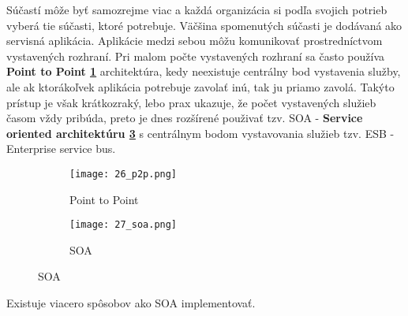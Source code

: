 Súčastí môže byť samozrejme viac a každá organizácia si podľa svojich potrieb vyberá tie  súčasti, ktoré potrebuje. Väčšina spomenutých súčasti je dodávaná ako servisná aplikácia. Aplikácie medzi sebou môžu komunikovať prostredníctvom vystavených rozhraní. Pri malom počte vystavených rozhraní sa často používa \textbf{Point to Point \ref{26_p2p}} architektúra, kedy neexistuje centrálny bod vystavenia služby, ale ak ktorákoľvek aplikácia potrebuje zavolať inú, tak ju priamo zavolá. Takýto prístup je však krátkozraký, lebo prax ukazuje, že počet vystavených služieb časom vždy pribúda, preto je dnes rozšírené použivať tzv. SOA - \textbf{Service oriented architektúru \ref{27_soa}} s centrálnym bodom vystavovania služieb tzv. ESB - Enterprise service bus.
\begin{figure}[!htbp]
\centering
\begin{subfigure}{0.5\linewidth}
\texttt{[image: 26\_p2p.png]}
\caption{Point to Point \cite{IOT13}}
\label{26_p2p}
\end{subfigure}%
\begin{subfigure}{0.5\linewidth}
\texttt{[image: 27\_soa.png]}
\caption{SOA \cite{IOT13}}
\label{27_soa}
\end{subfigure}
\end{figure}
Existuje viacero spôsobov ako SOA implementovať. 
